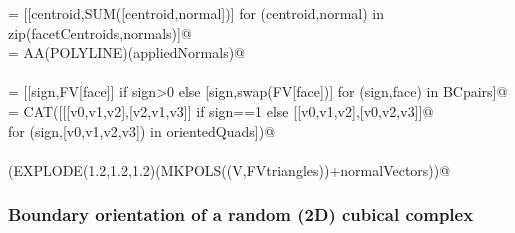 \documentclass[11pt,oneside]{article}    %
\begin{document}
\begin{flushleft}
\begin{list}{}{}
\mbox{}\verb@appliedNormals = [[centroid,SUM([centroid,normal])] for (centroid,normal) in zip(facetCentroids,normals)]@\\
\mbox{}\verb@normalVectors = AA(POLYLINE)(appliedNormals)@\\
\mbox{}\verb@@\\
\mbox{}\verb@orientedQuads = [[sign,FV[face]] if sign>0 else [sign,swap(FV[face])] for (sign,face) in BCpairs]@\\
\mbox{}\verb@FVtriangles = CAT([[[v0,v1,v2],[v2,v1,v3]] if sign==1 else [[v0,v1,v2],[v0,v2,v3]]@\\
\mbox{}\verb@            for (sign,[v0,v1,v2,v3]) in orientedQuads])@\\
\mbox{}\verb@@\\
\mbox{}\verb@VIEW(EXPLODE(1.2,1.2,1.2)(MKPOLS((V,FVtriangles))+normalVectors))@\\
\mbox{}\verb@@{\NWsep}
\end{list}
\vspace{-2ex}
\end{flushleft}





\subsubsection{Boundary orientation of a random (2D) cubical complex}
\end{document}
